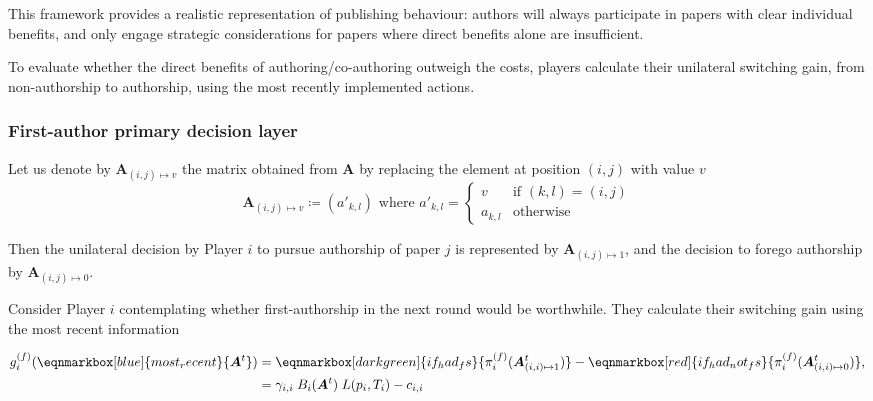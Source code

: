 \documentclass[12pt]{article}
\begin{document}
This framework provides a realistic representation of publishing behaviour: 
authors will always participate in papers with clear individual benefits, 
and only engage strategic considerations for papers 
where direct benefits alone are insufficient.

To evaluate whether the direct benefits of authoring/co-authoring outweigh the costs,
players calculate their unilateral switching gain, from non-authorship to authorship, 
using the most recently implemented actions.

\subsubsection{First-author primary decision layer}
\label{first_author_primary}

Let us denote by $\boldsymbol{A}_{(i,j) \mapsto v}$ the matrix obtained from $\boldsymbol{A}$ by replacing the element at position $(i,j)$ with value $v$
\begin{equation*}
    \boldsymbol{A}_{(i,j) \mapsto v} \coloneq (a'_{k,l}) \text{ where } a'_{k,l} = 
    \begin{cases}
        v & \text{if } (k,l) = (i,j) \\
        a_{k,l} & \text{otherwise}
    \end{cases}
\end{equation*}

Then the unilateral decision by Player $i$ to pursue authorship of paper $j$ 
is represented by $\boldsymbol{A}_{(i,j) \mapsto 1}$, 
and the decision to forego authorship by $\boldsymbol{A}_{(i,j) \mapsto 0}$.

Consider Player $i$ contemplating 
whether first-authorship in the next round would be worthwhile. 
They calculate their switching gain using the most recent information

\vspace{1em}
\begin{align}
    g_i^{(f)}(\eqnmarkbox[blue]{most_recent}{\boldsymbol{A}^{t}})
    & = \eqnmarkbox[darkgreen]{if_had_fs}{\pi_i^{(f)}(
            \boldsymbol{A}_{(i, i) \mapsto 1}^t
        )}
        - \eqnmarkbox[red]{if_had_not_fs}{\pi_i^{(f)}(
            \boldsymbol{A}_{(i, i) \mapsto 0}^t
        )}, \nonumber \\
    &= \gamma_{i, i} \; B_i(\boldsymbol{A}^t) \; L(p_i, T_i) - c_{i, i}
\end{align}
\end{document}
